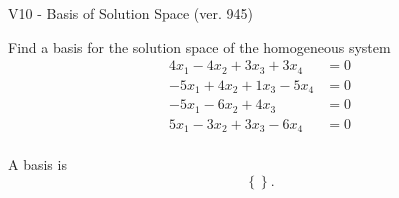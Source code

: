 \begin{exercise}
  \begin{exerciseTitle}V10 - Basis of Solution Space (ver. 945)\end{exerciseTitle}
  \begin{exerciseStatement}
    Find a basis for the solution space of the homogeneous system 
\begin{align*}
 4 x_ 1 -4 x_ 2 + 3 x_ 3 + 3 x_ 4 &= 0  \\ 
  -5 x_ 1 + 4 x_ 2 + 1 x_ 3 -5 x_ 4 &= 0  \\ 
  -5 x_ 1 -6 x_ 2 + 4 x_ 3 &= 0  \\ 
  5 x_ 1 -3 x_ 2 + 3 x_ 3 -6 x_ 4 &= 0  \\ 
 \end{align*}


 
  \end{exerciseStatement}

  \begin{exerciseAnswer}
   A basis is   
\[\left\{\right\}.\]

  


  \end{exerciseAnswer}
\end{exercise}